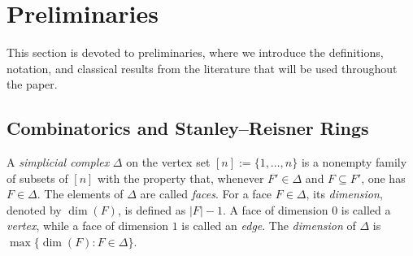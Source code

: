 \documentclass[12pt]{amsart}
\newtheorem{Theorem}{Theorem}[section]
\begin{document}






\section{Preliminaries}\label{Sec1: Preliminaries}
This section is devoted to preliminaries, where we introduce the definitions, notation, and classical results from the literature that will be used throughout the paper.

\subsection{Combinatorics and Stanley--Reisner Rings}\label{Subsec1} A \textit{simplicial complex} $\Delta$ on the vertex set $[n] := \{1,\dots,n\}$ is a nonempty family of subsets of $[n]$ with the property that, whenever $F' \in \Delta$ and $F \subseteq F'$, one has $F \in \Delta$. The elements of $\Delta$ are called \textit{faces}. For a face $F \in \Delta$, its \textit{dimension}, denoted by $\dim(F)$, is defined as $|F| - 1$. A face of dimension $0$ is called a \textit{vertex}, while a face of dimension $1$ is called an \textit{edge}. The \textit{dimension} of $\Delta$ is $\max\{\dim(F) : F \in \Delta\}$.
\end{document}
